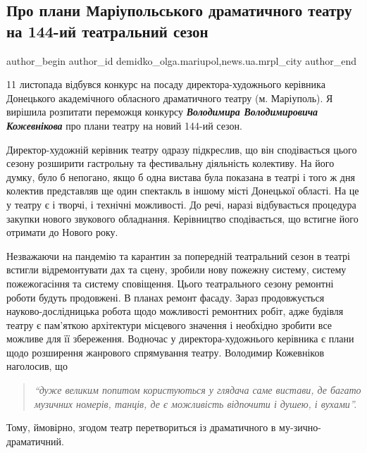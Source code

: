  
 
 
 
 
 
\subsection{Про плани Маріупольського драматичного театру на 144-ий театральний сезон}
\label{sec:29_11_2021.stz.news.ua.mrpl_city.1.plany_dramteatr_144_sezon}
 
\ifcmt
 author_begin
   author_id demidko_olga.mariupol,news.ua.mrpl_city
 author_end
\fi

11 листопада відбувся конкурс на посаду директора-художнього керівника
Донецького академічного обласного драматичного театру (м. Маріуполь). Я
вирішила розпитати переможця конкурсу \emph{\textbf{Володимира Володимировича Кожевнікова}} про
плани театру на новий 144-ий сезон.

Директор-художній керівник театру одразу підкреслив, що він сподівається цього
сезону розширити гастрольну та фестивальну діяльність колективу. На його думку,
було б непогано, якщо б одна вистава була показана в театрі і того ж дня
колектив представляв ще один спектакль в іншому місті Донецької області. На це
у театру є і творчі, і технічні можливості. До речі, наразі відбувається
процедура закупки нового звукового обладнання. Керівництво сподівається, що
встигне його отримати до Нового року.


Незважаючи на пандемію та карантин за попередній театральний сезон в театрі
встигли відремонтувати дах та сцену, зробили нову пожежну систему, систему
пожежогасіння та систему сповіщення. Цього театрального сезону ремонтні роботи
будуть продовжені. В планах ремонт фасаду. Зараз продовжується
науково-дослідницька робота щодо можливості ремонтних робіт, адже будівля
театру є пам'яткою архітектури місцевого значення і необхідно зробити все
можливе для її збереження. Водночас у директора-художнього керівника є плани
щодо розширення жанрового спрямування театру. Володимир Кожевніков наголосив,
що 
\begin{quote}
\em\enquote{дуже великим попитом користуються у глядача саме вистави, де багато
музичних номерів, танців, де є можливість відпочити і душею, і вухами}.
\end{quote}
Тому, ймовірно, згодом театр перетвориться із драматичного в му\hyp{}зично-драматичний.

